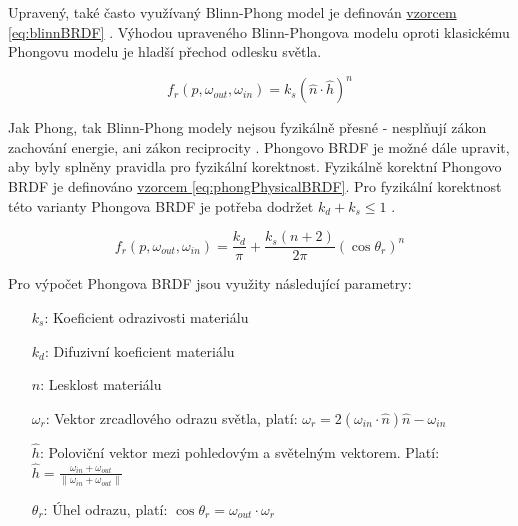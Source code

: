 \documentclass[czech,master,dept460,male,cpp,cpdeclaration]{diploma}
\newcommand{\uvec}[1]{\hat{#1}}
\newcommand{\refl}{\omega_{r}}
\begin{document}
Upravený, také často využívaný Blinn-Phong model je definován \hyperref[eq:blinnBRDF]{vzorcem \ref{eq:blinnBRDF}} \cite{BlinnPhong1977}. Výhodou upraveného Blinn-Phongova modelu oproti klasickému Phongovu modelu je hladší přechod odlesku světla.

\begin{equation} \label{eq:blinnBRDF}
    f_r\left(p,\omega_{out},\omega_{in}\right) = k_s(\uvec{n}\cdot\uvec{h})^n
\end{equation}

Jak Phong, tak Blinn-Phong modely nejsou fyzikálně přesné - nesplňují zákon zachování energie, ani zákon reciprocity \cite{BRDFOverview}. Phongovo BRDF je možné dále upravit, aby byly splněny pravidla pro fyzikální korektnost. Fyzikálně korektní Phongovo BRDF je definováno \hyperref[eq:phongPhysicalBRDF]{vzorcem \ref{eq:phongPhysicalBRDF}}. Pro fyzikální korektnost této varianty Phongova BRDF je potřeba dodržet \(k_d + k_s \leq 1\) \cite{LaFortunePhongBRDF}.

\begin{equation} \label{eq:phongPhysicalBRDF}
    f_r\left(p,\omega_{out},\omega_{in}\right) = \frac{k_d}{\pi} +
    \frac{k_s\left(n+2\right)}{2\pi}\left(\cos\theta_r\right)^n
\end{equation}

Pro výpočet Phongova BRDF jsou využity následující parametry:
\begin{itemize}
    \item[\(k_s\):] Koeficient odrazivosti materiálu
    \item[\(k_d\):] Difuzivní koeficient materiálu
    \item[\(n\):] Lesklost materiálu
    \item[\(\refl\):] Vektor zrcadlového odrazu světla, platí: \(\refl = 2\left(\omega_{in}\cdot\uvec{n}\right)\uvec{n}-\omega_{in}\)
    \item[\(\uvec{h}\):] Poloviční vektor mezi pohledovým a světelným vektorem. Platí: \(\uvec{h} = \frac{\omega_{in} + \omega_{out}}{\| \omega_{in} + \omega_{out}\|}\)
    \item[\(\theta_r\):] Úhel odrazu, platí: \(\cos\theta_r = \omega_{out}\cdot\refl\)
\end{itemize}
\end{document}
